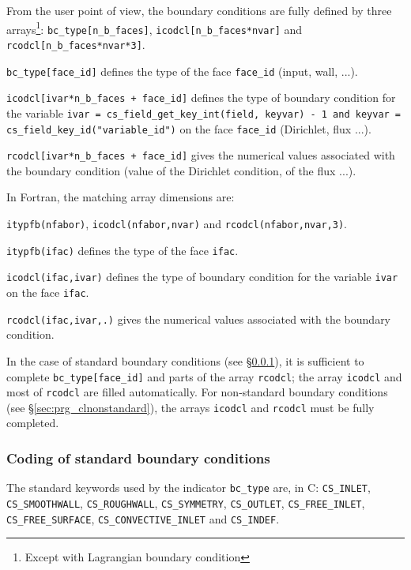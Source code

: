From the user point of view, the boundary conditions are fully
defined by three arrays\footnote{Except with Lagrangian boundary condition}:
\texttt{bc\_type[n\_b\_faces]},
\texttt{icodcl[n\_b\_faces*nvar]} and
\texttt{rcodcl[n\_b\_faces*nvar*3]}.
\begin{list}{-}{}
\item \texttt{bc\_type[face\_id]} defines the type of the face \texttt{face\_id}
      (input, wall, ...).
\item \texttt{icodcl[ivar*n\_b\_faces + face\_id]} defines the type of boundary
      condition for the variable \texttt{ivar = cs\_field\_get\_key\_int(field, keyvar) - 1 and keyvar = cs\_field\_key\_id("variable\_id")} on the face \texttt{face\_id}
      (Dirichlet, flux ...).
\item \texttt{rcodcl[ivar*n\_b\_faces + face\_id]} gives the numerical values associated with the
      boundary condition (value of the Dirichlet condition, of the flux ...).
\end{list}

In Fortran, the matching array dimensions are:

\texttt{itypfb(nfabor)},
\texttt{icodcl(nfabor,nvar)} and
\texttt{rcodcl(nfabor,nvar,3)}.
\begin{list}{-}{}
\item \texttt{itypfb(ifac)} defines the type of the face \texttt{ifac}.
\item \texttt{icodcl(ifac,ivar)} defines the type of boundary
      condition for the variable \texttt{ivar} on the face \texttt{ifac}.
\item \texttt{rcodcl(ifac,ivar,.)} gives the numerical values associated with the
      boundary condition.
\end{list}

In the case of standard boundary conditions (see
\S\ref{sec:prg_clstandard}), it is sufficient to complete \texttt{bc\_type[face\_id]} and
parts of the array \texttt{rcodcl}; the array \texttt{icodcl} and most of \texttt{rcodcl} are filled automatically. For non-standard boundary
conditions (see \S\ref{sec:prg_clnonstandard}), the arrays \texttt{icodcl} and
\texttt{rcodcl} must be fully completed.

\subsubsection{Coding of standard boundary conditions}
\label{sec:prg_clstandard}%
The standard keywords used by the indicator \texttt{bc\_type} are, in C:
\texttt{CS\_INLET}, \texttt{CS\_SMOOTHWALL},
\texttt{CS\_ROUGHWALL}, \texttt{CS\_SYMMETRY},
\texttt{CS\_OUTLET}, \texttt{CS\_FREE\_INLET}, \texttt{CS\_FREE\_SURFACE},
\texttt{CS\_CONVECTIVE\_INLET} and \texttt{CS\_INDEF}.

